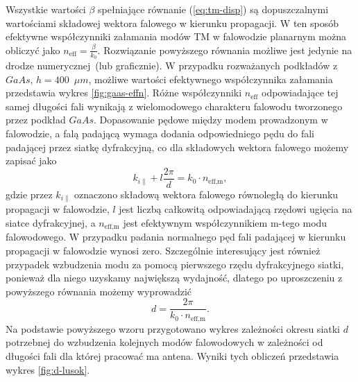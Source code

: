 Wszystkie wartości $\beta$ spełniające  równanie (\ref{eq:tm-disp}) są dopuszczalnymi wartościami składowej wektora falowego w kierunku propagacji. W ten sposób efektywne współczynniki załamania modów TM w falowodzie planarnym można obliczyć jako $n_{\textrm{eff}}=\frac{\beta}{k_0}$. Rozwiązanie powyższego równania możliwe jest jedynie na drodze numerycznej~(lub graficznie). W przypadku rozważanych podkładów z $GaAs$, $h=400$~$\mu m$, możliwe wartości efektywnego współczynnika załamania przedstawia wykres \ref{fig:gaas-effn}. Różne współczynniki $n_{\textrm{eff}}$ odpowiadające tej samej długości fali wynikają z wielomodowego charakteru falowodu tworzonego przez podkład $GaAs$. Dopasowanie pędowe między modem prowadzonym w falowodzie, a falą padającą wymaga dodania odpowiedniego pędu do fali padającej przez siatkę dyfrakcyjną, co dla składowych wektora falowego możemy zapisać jako
\[
k_{i \parallel} + l \frac{2\pi}{d} = k_0 \cdot n_{\textrm{eff,m}}, 
\]
gdzie przez $k_{i \parallel}$ oznaczono składową wektora falowego równoległą do kierunku propagacji w falowodzie, $l$ jest liczbą całkowitą odpowiadającą rzędowi ugięcia na siatce dyfrakcyjnej, a $n_{\textrm{eff,m}}$ jest efektywnym współczynnikiem m-tego modu falowodowego. W przypadku padania normalnego pęd fali padającej w kierunku propagacji w falowodzie wynosi zero. Szczególnie interesujący jest również przypadek wzbudzenia modu za pomocą pierwszego rzędu dyfrakcyjnego siatki, ponieważ dla niego uzyskamy największą wydajność, dlatego po uproszczeniu z powyższego równania możemy wyprowadzić
\begin{equation}
d=\frac{2 \pi}{k_0 \cdot n_{\textrm{eff,m}}}.
\label{eq:d-do-wzbudzenia}
\end{equation}
Na podstawie powyższego wzoru przygotowano wykres zależności okresu siatki $d$ potrzebnej do wzbudzenia kolejnych modów falowodowych w zależności od długości fali dla której pracować ma antena. Wyniki tych obliczeń przedstawia wykres \ref{fig:d-lusok}.

